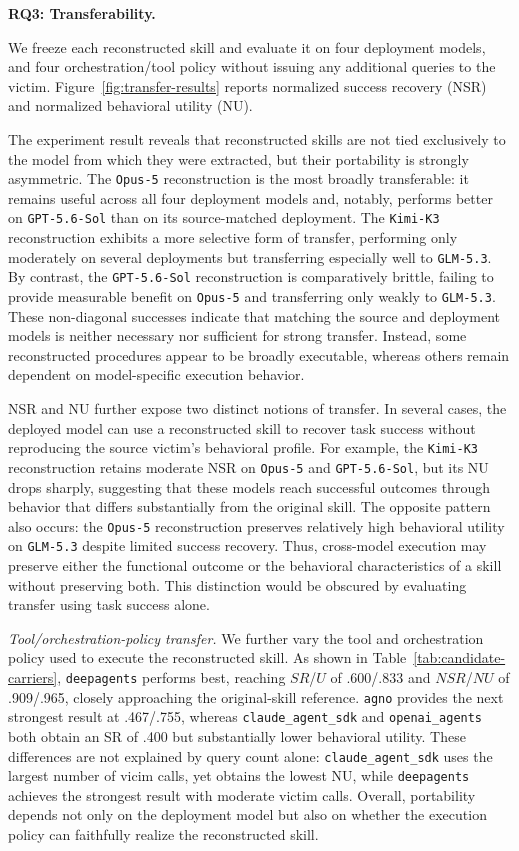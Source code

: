 \documentclass[letterpaper,twocolumn,10pt]{article}
\newcommand{\paragraphtitle}[1]{%
  \vspace{5pt}\noindent\textbf{#1.}%
}
\begin{document}
\paragraphtitle{RQ3: Transferability}
We freeze each reconstructed skill and evaluate it on four deployment
models, and four orchestration/tool policy without issuing any additional queries to the victim.
Figure~\ref{fig:transfer-results} reports normalized success recovery
(NSR) and normalized behavioral utility (NU).

The experiment result reveals that reconstructed skills are not tied
exclusively to the model from which they were extracted, but their
portability is strongly asymmetric. The \texttt{Opus-5} reconstruction
is the most broadly transferable: it remains useful across all four
deployment models and, notably, performs better on
\texttt{GPT-5.6-Sol} than on its source-matched deployment. The
\texttt{Kimi-K3} reconstruction exhibits a more selective form of
transfer, performing only moderately on several deployments but
transferring especially well to \texttt{GLM-5.3}. By contrast, the
\texttt{GPT-5.6-Sol} reconstruction is comparatively brittle, failing
to provide measurable benefit on \texttt{Opus-5} and transferring only
weakly to \texttt{GLM-5.3}. These non-diagonal successes indicate that
matching the source and deployment models is neither necessary nor
sufficient for strong transfer. Instead, some reconstructed procedures
appear to be broadly executable, whereas others remain dependent on
model-specific execution behavior.

NSR and NU further expose two distinct notions of transfer. In several
cases, the deployed model can use a reconstructed skill to recover task
success without reproducing the source victim's behavioral profile. For
example, the \texttt{Kimi-K3} reconstruction retains moderate NSR on
\texttt{Opus-5} and \texttt{GPT-5.6-Sol}, but its NU drops sharply,
suggesting that these models reach successful outcomes through behavior
that differs substantially from the original skill. The opposite pattern
also occurs: the \texttt{Opus-5} reconstruction preserves relatively
high behavioral utility on \texttt{GLM-5.3} despite limited success
recovery. Thus, cross-model execution may preserve either the functional
outcome or the behavioral characteristics of a skill without preserving
both. This distinction would be obscured by evaluating transfer using
task success alone.

\noindent\emph{Tool/orchestration-policy transfer.}
We further vary the tool and orchestration policy used to execute the
reconstructed skill. As shown in Table~\ref{tab:candidate-carriers},
\texttt{deepagents} performs best, reaching $SR$/$U$ of .600/.833 and
$NSR$/$NU$ of .909/.965, closely approaching the original-skill reference.
\texttt{agno} provides the next strongest result at .467/.755, whereas
\texttt{claude\_agent\_sdk} and \texttt{openai\_agents} both obtain an
SR of .400 but substantially lower behavioral utility. These differences
are not explained by query count alone: \texttt{claude\_agent\_sdk}
uses the largest number of vicim calls, yet obtains the
lowest NU, while \texttt{deepagents} achieves the strongest result with moderate victim calls. Overall, portability depends not only on the deployment model
but also on whether the execution policy can faithfully realize the
reconstructed skill.
\end{document}
